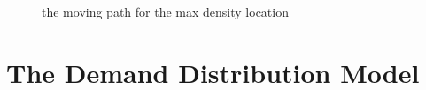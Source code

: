 \documentclass{mcmthesis}
\begin{document}
\begin{figure}[htbp]
{\begin{minipage}[pt]{0.5\linewidth}
    \end{minipage}%
    }%
    \centering
  \end{figure}

  \begin{figure}[h]
    \caption{the moving path for the max density location}\label{figure1}
  \end{figure}
 
\section{The Demand Distribution Model}
\end{document}
